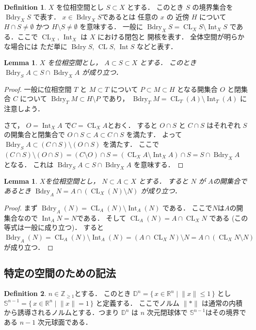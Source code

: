 \documentclass[leqno, a4paper, 12pt]{jsarticle}
\theoremstyle{plain}
\newtheorem{lem}[thm]{Lemma}
\theoremstyle{definition}
\newtheorem{df}{Definition}[section]
\theoremstyle{remark}
\newcommand{\zz}{\mathbb{Z}}
\newcommand{\rr}{\mathbb{R}}
\DeclareMathOperator{\bd}{\mathrm{Bdry}}
\DeclareMathOperator{\cl}{\mathrm{CL}}
\DeclareMathOperator{\nai}{\mathrm{Int}}
\newcommand{\yospfont}[1]{\mathbb{#1}}
\newcommand{\yodisc}[1]{\yospfont{D}^{#1}}
\newcommand{\yosphere}[1]{\yospfont{S}^{#1}}
\numberwithin{equation}{section}
\begin{document}
\begin{df}
$X$
を位相空間とし
$S\subset X$
とする．
このとき
$S$
の境界集合を
$\bd_{X}S$
で表す．
$x\in \bd_{X}S$であるとは
任意の
$x$
の
近傍
$H$
について
$H\cap S\neq \emptyset$
かつ
$H\setminus S\neq \emptyset$
を意味する．
一般に
$\bd_{X}S=\cl_{X}S\setminus \nai_{X}S$
である．ここで
$\cl_{X}$, 
$\nai_{X}$
は
$X$
における閉包と
開核を表す．
全体空間が明らかな場合には
ただ単に
$\bd S$, 
$\cl S$, 
$\nai S$
などと表す．
\end{df}

\begin{lem}\label{lem:par}
$X$
を位相空間とし，
$A\subset S\subset X$
とする．
このとき
$\bd_{S} A\subset S\cap \bd_{X}A$
が成り立つ．
\end{lem}
\begin{proof}
一般に位相空間
$T$
と
$M\subset T$
について
$P\subset M\subset H$
となる開集合
$O$
と閉集合
$C$
について
$\bd_{T}M\subset H\setminus P$
であり，
$\bd_{T}M=\cl_{T}(A)\setminus \nai_{T}(A)$
に注意しよう．

さて，
$O=\nai_{X}A$
で$C=\cl_{X}A$とおく．
すると
$O\cap S$
と
$C\cap S$
はそれぞれ
$S$
の開集合と閉集合で
$O\cap S\subset A\subset C\cap S$
を満たす．
よって
$\bd_{S}A\subset (C\cap S)\setminus (O\cap S)$
を満たす．
ここで
$(C\cap S)\setminus (O\cap S)=
(C\setminus O)\cap S=(\cl_{X}A\setminus \nai_{X}A)\cap S=S\cap \bd_{X}A$
となる．
これは
$\bd_{S}A\subset S\cap \bd_{X}A$
を意味する．
\end{proof}



\begin{lem}\label{lem:partial}
$X$を位相空間とし，
$N\subset A\subset X$
とする．
すると
$N$
が
$A$の開集合であるとき
$\bd_{A} N=A\cap (\cl_{X}(N)\setminus N)$
が成り立つ．
\end{lem}
\begin{proof}
まず
$\bd_{A}(N)=\cl_{A}(N)\setminus \nai_{A}(N)$
である．
ここで$N$は$A$の開集合なので
$\nai_{A}N=N$である．
そして
$\cl_{A}(N)=A\cap \cl_{X}N$
である
(この等式は一般に成り立つ)．
すると
$\bd_{A}(N)=\cl_{A}(N)\setminus \nai_{A}(N)
=(A\cap \cl_{X}N)\setminus N=A\cap (\cl_{X}N\setminus N)$
が成り立つ．
\end{proof}


\subsection{特定の空間のための記法}\label{subsec:notation}

\begin{df}
$n\in \zz_{\ge 1}$とする．
このとき
$\yodisc{n}=\{\, x\in \rr^{n}\mid \lVert x \rVert\le 1\, \}$
とし
$\yosphere{n-1}=\{\, x\in \rr^{n}\mid \lVert x \rVert=1\, \}$
と定義する．
ここでノルム
$\lVert *\rVert$
は通常の内積から誘導されるノルムとする．つまり
$\yodisc{n}$
は
$n$
次元閉球体で
$\yosphere{n-1}$はその境界である
$n-1$
次元球面である．
\end{df}
\end{document}
